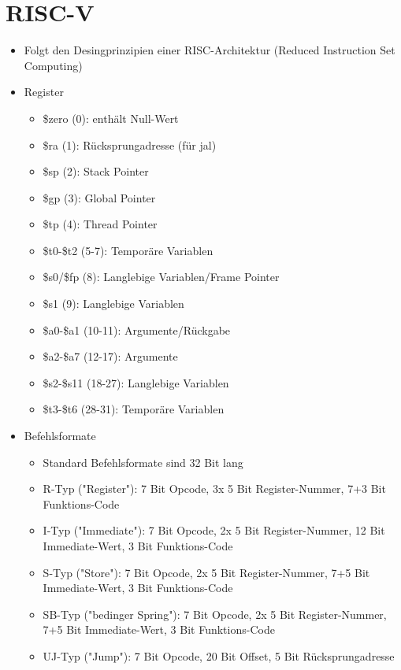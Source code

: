 \documentclass{kit}
\begin{document}
\section{RISC-V}
  \begin{itemize}
    \item Folgt den Desingprinzipien einer RISC-Architektur (Reduced Instruction Set Computing)
    \item Register
      \begin{itemize}
        \item \$zero (0): enthält Null-Wert
        \item \$ra (1): Rücksprungadresse (für jal)
        \item \$sp (2): Stack Pointer
        \item \$gp (3): Global Pointer
        \item \$tp (4): Thread Pointer
        \item \$t0-\$t2 (5-7): Temporäre Variablen
        \item \$s0/\$fp (8): Langlebige Variablen/Frame Pointer
        \item \$s1 (9): Langlebige Variablen
        \item \$a0-\$a1 (10-11): Argumente/Rückgabe
        \item \$a2-\$a7 (12-17): Argumente
        \item \$s2-\$s11 (18-27): Langlebige Variablen 
        \item \$t3-\$t6 (28-31): Temporäre Variablen 
      \end{itemize}
    \item Befehlsformate
      \begin{itemize}
        \item Standard Befehlsformate sind 32 Bit lang
        \item R-Typ ("Register"): 7 Bit Opcode, 3x 5 Bit Register-Nummer, 7+3 Bit Funktions-Code
        \item I-Typ ("Immediate"): 7 Bit Opcode, 2x 5 Bit Register-Nummer, 12 Bit Immediate-Wert,
          3 Bit Funktions-Code
        \item S-Typ ("Store"): 7 Bit Opcode, 2x 5 Bit Register-Nummer, 7+5 Bit Immediate-Wert, 3 Bit 
          Funktions-Code
        \item SB-Typ ("bedinger Spring"): 7 Bit Opcode, 2x 5 Bit Register-Nummer, 7+5 Bit 
          Immediate-Wert, 3 Bit Funktions-Code
        \item UJ-Typ ("Jump"): 7 Bit Opcode, 20 Bit Offset, 5 Bit Rücksprungadresse

\end{itemize}
\end{itemize}
\end{document}
